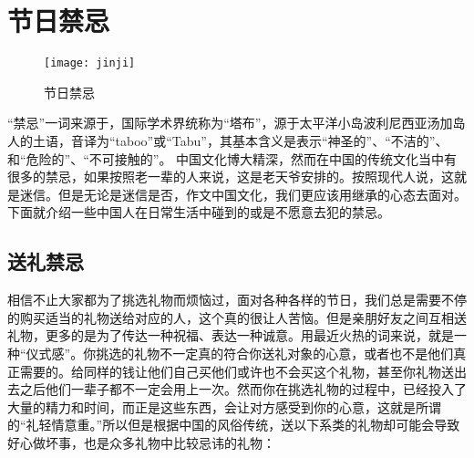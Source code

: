 \section{节日禁忌} 
\begin{figure}[htb]
    \centering
    \texttt{[image: jinji]}
    \caption{节日禁忌}
    
\end{figure}

    “禁忌”一词来源于，国际学术界统称为“塔布”，源于太平洋小岛波利尼西亚汤加岛人的土语，音译为“taboo”或“Tabu”，其基本含义是表示“神圣的”、“不洁的”、和“危险的”、“不可接触的”。
    中国文化博大精深，然而在中国的传统文化当中有很多的禁忌，如果按照老一辈的人来说，这是老天爷安排的。按照现代人说，这就是迷信。但是无论是迷信是否，作文中国文化，我们更应该用继承的心态去面对。下面就介绍一些中国人在日常生活中碰到的或是不愿意去犯的禁忌。



\subsection{送礼禁忌}

    相信不止大家都为了挑选礼物而烦恼过，面对各种各样的节日，我们总是需要不停的购买适当的礼物送给对应的人，这个真的很让人苦恼。但是亲朋好友之间互相送礼物，更多的是为了传达一种祝福、表达一种诚意。用最近火热的词来说，就是一种“仪式感”。你挑选的礼物不一定真的符合你送礼对象的心意，或者也不是他们真正需要的。给同样的钱让他们自己买他们或许也不会买这个礼物，甚至你礼物送出去之后他们一辈子都不一定会用上一次。然而你在挑选礼物的过程中，已经投入了大量的精力和时间，而正是这些东西，会让对方感受到你的心意，这就是所谓的“礼轻情意重。”所以但是根据中国的风俗传统，送以下系类的礼物却可能会导致好心做坏事，也是众多礼物中比较忌讳的礼物：

